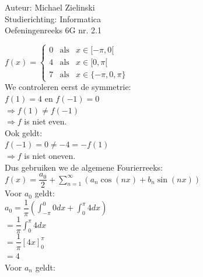 \documentclass[a4paper]{article}
\newcommand{\dint}{\displaystyle\int}
\begin{document}
  
\noindent \large Auteur: Michael Zielinski \\
\noindent \large Studierichting: Informatica\\
\noindent \large Oefeningenreeks 6G nr. 2.1 \\

\medskip

\normalsize

$ f(x) =
\left\{
    \begin{array}{lrr}
        0 & \text{als} & x\in[-\pi,0[ \\
        4 & \text{als} & x\in[0,\pi[ \\
        7 & \text{als} & x\in\{-\pi,0,\pi\}
    \end{array}
\right. $ \\

We controleren eerst de symmetrie: \\

$ f(1)=4 $ en $ f(-1)=0 $ \\

$ \Rightarrow f(1)\neq f(-1) $ \\

$ \Rightarrow f $ is niet even. \\

Ook geldt: \\

$ f(-1)=0 \neq -4=-f(1) $ \\

$ \Rightarrow f $ is niet oneven. \\

Dus gebruiken we de algemene Fourierreeks: \\

$ f(x)=\dfrac{a_0}{2}+\displaystyle\sum_{n=1}^{\infty}\left(a_n\cos(nx)+b_n\sin(nx)\right) $ \\

Voor $a_0$ geldt: \\

$ a_0=\dfrac{1}{\pi}\left(\dint_{-\pi}^{0}0dx+\dint_{0}^{\pi}4dx\right) $ \\

$ =\dfrac{1}{\pi}\dint_{0}^{\pi}4dx $ \\

$ =\dfrac{1}{\pi}\left[4x\right]_{0}^{\pi} $ \\

$ =4 $ \\

Voor $a_n$ geldt: \\
\end{document}
